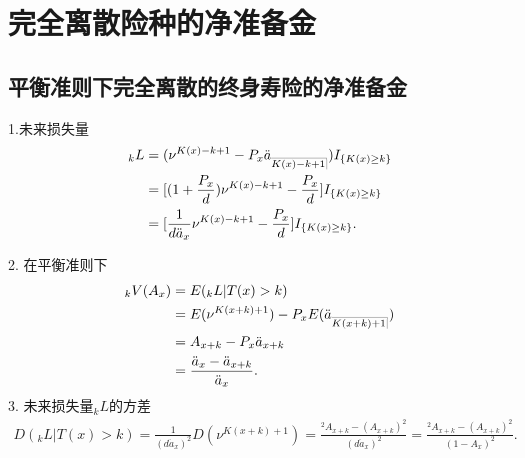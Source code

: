 \documentclass[lang=cn,10pt]{elegantbook}
\makeatletter
\DeclareRobustCommand{\annu}[1]{_{%
    \def\arraystretch{0}%
    \setlength\arraycolsep{1pt}%
    \setlength\arrayrulewidth{.2pt}%
    \begin{array}[b]{@{}c|}\hline
        \\[\arraycolsep]%
        \scriptstyle #1%
    \end{array}%
}}
\makeatother
\begin{document}
\section{完全离散险种的净准备金}
\subsection{平衡准则下完全离散的终身寿险的净准备金}
\begin{proposition}
    1.未来损失量
\begin{align*}
    {}_kL&= (\nu^{K(x)-k+1}-P_x \ddot a_{\annu {K(x)-k+1}} )I_{\{K(x)\ge k\}} \\
                        &= [ (1+\frac{P_x }{d} )\nu^{K(x)-k+1}-\frac{P_x}{d} ] I_{\{K(x)\ge k\}}\\
                        &= [\frac{1}{d\ddot a_x}\nu^{K(x)-k+1}-\frac{P_x }{d} ]I_{\{K(x)\ge k\}}.
\end{align*}

2. 在平衡准则下
\begin{align*}
    {}_kV(A_x)  &=E({}_kL|T(x)>k) \\
                &=E (\nu^{K(x+k)+1} )-P_x E (\ddot a_{\annu {K(x+k)+1}} )\\
                &= A_{x+k}-P_x\ddot a_{x+k}\\
                &=\frac{\ddot a_x-\ddot a_{x+k}}{\ddot a_x}.
\end{align*}
3. 未来损失量$_kL$的方差
\begin{align*}
    D(_kL|T(x)>k) =\frac{1}{(d\ddot a_x)^2}D(\nu^{K(x+k)+1}) = \frac{{}^2 A_{x+k}-( A_{x+k})^2}{(d\ddot a_x)^2}=\frac{{}^2 A_{x+k}-( A_{x+k})^2}{(1-A_x)^2}.  \end{align*}
\end{proposition}
\end{document}
